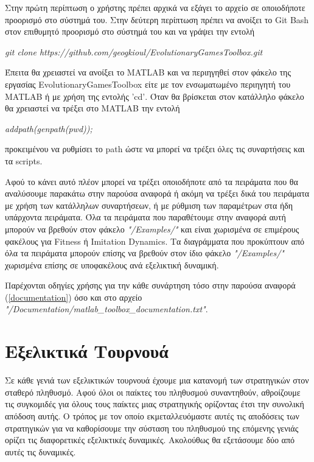 \documentclass[12pt]{report}
\begin{document}
Στην πρώτη περίπτωση ο χρήστης πρέπει αρχικά να εξάγει το αρχείο σε οποιοδήποτε προορισμό στο σύστημά του. Στην δεύτερη περίπτωση πρέπει να ανοίξει το \foreignlanguage{english}{Git Bash} στον επιθυμητό προορισμό στο σύστημά του και να γράψει την εντολή 
\begin{center}
    \foreignlanguage{english}{\textit{git clone https://github.com/geogkioul/EvolutionaryGamesToolbox.git}}
\end{center}
 Έπειτα θα χρειαστεί να ανοίξει το \foreignlanguage{english}{MATLAB} και να περιηγηθεί στον φάκελο της εργασίας \foreignlanguage{english}{EvolutionaryGamesToolbox} είτε με τον ενσωματωμένο περιηγητή του \foreignlanguage{english}{MATLAB} ή με χρήση της εντολής \foreignlanguage{english}{'cd'}. Όταν θα βρίσκεται στον κατάλληλο φάκελο θα χρειαστεί να τρέξει στο \foreignlanguage{english}{MATLAB} την εντολή
\begin{center}
\foreignlanguage{english}{\textit{addpath(genpath(pwd));}}
\end{center} προκειμένου να ρυθμίσει το \foreignlanguage{english}{path} ώστε να μπορεί να τρέξει όλες τις συναρτήσεις και τα \foreignlanguage{english}{scripts}.

Αφού το κάνει αυτό πλέον μπορεί να τρέξει οποιοδήποτε από τα πειράματα που θα αναλύσουμε παρακάτω στην παρούσα αναφορά ή ακόμη να τρέξει δικά του πειράματα με χρήση των κατάλληλων συναρτήσεων, ή με ρύθμιση των παραμέτρων στα ήδη υπάρχοντα πειράματα. Όλα τα πειράματα που παραθέτουμε στην αναφορά αυτή μπορούν να βρεθούν στον φάκελο \foreignlanguage{english}{\textit{"/Examples/"}} και είναι χωρισμένα σε επιμέρους φακέλους για \foreignlanguage{english}{Fitness} ή \foreignlanguage{english}{Imitation Dynamics}. Τα διαγράμματα που προκύπτουν από όλα τα πειράματα μπορούν επίσης να βρεθούν στον ίδιο φάκελο \foreignlanguage{english}{\textit{"/Examples/"}} χωρισμένα επίσης σε υποφακέλους ανά εξελικτική δυναμική.

Παρέχονται οδηγίες χρήσης για την κάθε συνάρτηση τόσο στην παρούσα αναφορά (\ref{documentation}) όσο και στο αρχείο \foreignlanguage{english}{\textit{"/Documentation/matlab\_toolbox\_documentation.txt"}}.


\chapter{Εξελικτικά Τουρνουά}
Σε κάθε γενιά των εξελικτικών τουρνουά έχουμε μια κατανομή των στρατηγικών στον σταθερό πληθυσμό. Αφού όλοι οι παίκτες του πληθυσμού συναντηθούν, αθροίζουμε τις συγκομιδές για όλους τους παίκτες μιας στρατηγικής ορίζοντας έτσι την \label{συνολική απόδοση}συνολική απόδοση αυτής. Ο τρόπος με τον οποίο εκμεταλλευόμαστε αυτές τις αποδόσεις των στρατηγικών για να καθορίσουμε την σύσταση του πληθυσμού της επόμενης γενιάς ορίζει τις διαφορετικές εξελικτικές δυναμικές. Ακολούθως θα εξετάσουμε δύο από αυτές τις δυναμικές.
\end{document}
